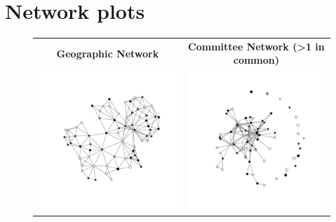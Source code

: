 \documentclass[12pt]{article}
\begin{document}
\section{Network plots}

\begin{figure}
\centering
\begin{tabular}{cc}
{\bf Geographic Network} & {\bf Committee Network (>1 in common)}\\
\includegraphics[scale=.55, clip=true,trim =2cm 2cm 2cm 2cm ]{./images/coppock_geographic_net.pdf} & \includegraphics[scale=.55, clip=true,trim =2cm 2cm 2cm 2cm]{./images/nm_committee_net.pdf} \\ 

\end{tabular}
\end{figure}
\end{document}

